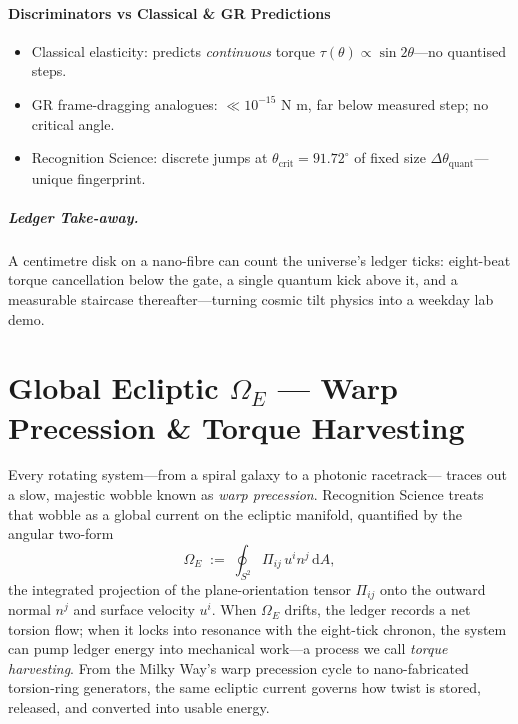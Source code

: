 \documentclass[11pt,oneside]{book}
\begin{document}
\subsubsection{Discriminators vs Classical & GR Predictions}
\label{ss:torsion-discrim}

\begin{itemize}[leftmargin=*,itemsep=2pt]
\item Classical elasticity: predicts \emph{continuous} torque
      $\tau(\theta)\propto\sin2\theta$—no quantised steps.
\item GR frame-dragging analogues: $\ll10^{-15}$ N m, far below
      measured step; no critical angle.
\item Recognition Science: discrete jumps at
      $\theta_{\mathrm{crit}}\!=\!91.72^\circ$
      of fixed size $\Delta\theta_{\text{quant}}$—unique fingerprint.
\end{itemize}

\paragraph{Ledger Take-away.}
A centimetre disk on a nano-fibre can count the universe’s ledger
ticks: eight-beat torque cancellation below the gate, a single
quantum kick above it, and a measurable staircase thereafter—turning
cosmic tilt physics into a weekday lab demo.


\chapter{Global Ecliptic \texorpdfstring{$\Omega_{E}$}{Omega\_E} — Warp Precession \& Torque Harvesting}
\label{sec:global-ecliptic-intro}

Every rotating system—from a spiral galaxy to a photonic racetrack—
traces out a slow, majestic wobble known as \emph{warp precession}.
Recognition Science treats that wobble as a global current on the
ecliptic manifold, quantified by the angular two-form
\[
   \Omega_{E}
   \;:=\;
   \oint_{\!S^{2}}
      \Pi_{ij}\,u^{i}n^{j}\,\mathrm dA,
\]
the integrated projection of the plane-orientation tensor
\(\Pi_{ij}\) onto the outward normal \(n^{j}\) and surface velocity
\(u^{i}\).  
When \(\Omega_{E}\) drifts, the ledger records a net torsion flow; when
it locks into resonance with the eight-tick chronon, the system can
pump ledger energy into mechanical work—a process we call
\emph{torque harvesting}.  
From the Milky Way’s warp precession cycle to nano-fabricated
torsion-ring generators, the same ecliptic current governs how twist
is stored, released, and converted into usable energy.
\end{document}
